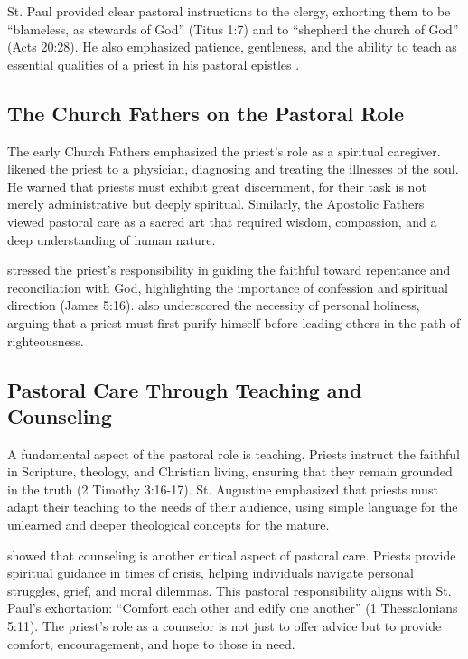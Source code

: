 \documentclass[12pt,doc]{apa7}   	%
\begin{document}
St. Paul provided clear pastoral instructions to the clergy, exhorting them to be ``blameless, as stewards of God'' (Titus 1:7) and to ``shepherd the church of God'' (Acts 20:28). He also emphasized patience, gentleness, and the ability to teach as essential qualities of a priest in his pastoral epistles \citep{hgb-youssef_pastoral_epsitles}.

\subsection{The Church Fathers on the Pastoral Role}

The early Church Fathers emphasized the priest’s role as a spiritual caregiver. \citet{priesthood_chrysostom} likened the priest to a physician, diagnosing and treating the illnesses of the soul. He warned that priests must exhibit great discernment, for their task is not merely administrative but deeply spiritual. Similarly, the Apostolic Fathers \citep{holmes_apostolic_fathers} viewed pastoral care as a sacred art that required wisdom, compassion, and a deep understanding of human nature.

\citet{priesthood_shenouda} stressed the priest’s responsibility in guiding the faithful toward repentance and reconciliation with God, highlighting the importance of confession and spiritual direction (James 5:16). \citet{st_basil_letters} also underscored the necessity of personal holiness, arguing that a priest must first purify himself before leading others in the path of righteousness.

\subsection{Pastoral Care Through Teaching and Counseling}

A fundamental aspect of the pastoral role is teaching. Priests instruct the faithful in Scripture, theology, and Christian living, ensuring that they remain grounded in the truth (2 Timothy 3:16-17). St. Augustine \citep{early_church_akin} emphasized that priests must adapt their teaching to the needs of their audience, using simple language for the unlearned and deeper theological concepts for the mature.

\citet{hgb-youssef_pastoral_epsitles} showed that counseling is another critical aspect of pastoral care. Priests provide spiritual guidance in times of crisis, helping individuals navigate personal struggles, grief, and moral dilemmas. This pastoral responsibility aligns with St. Paul’s exhortation: ``Comfort each other and edify one another'' (1 Thessalonians 5:11). The priest’s role as a counselor is not just to offer advice but to provide comfort, encouragement, and hope to those in need.
\end{document}
